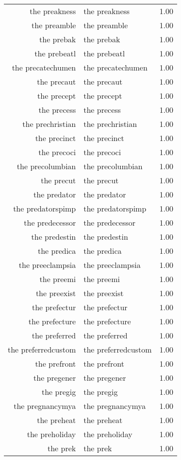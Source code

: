 \begin{table}[ht]
\begin{tabular}{rlr}
  the preakness & the preakness & 1.00 \\ 
  the preamble & the preamble & 1.00 \\ 
  the prebak & the prebak & 1.00 \\ 
  the prebeatl & the prebeatl & 1.00 \\ 
  the precatechumen & the precatechumen & 1.00 \\ 
  the precaut & the precaut & 1.00 \\ 
  the precept & the precept & 1.00 \\ 
  the precess & the precess & 1.00 \\ 
  the prechristian & the prechristian & 1.00 \\ 
  the precinct & the precinct & 1.00 \\ 
  the precoci & the precoci & 1.00 \\ 
  the precolumbian & the precolumbian & 1.00 \\ 
  the precut & the precut & 1.00 \\ 
  the predator & the predator & 1.00 \\ 
  the predatorspimp & the predatorspimp & 1.00 \\ 
  the predecessor & the predecessor & 1.00 \\ 
  the predestin & the predestin & 1.00 \\ 
  the predica & the predica & 1.00 \\ 
  the preeclampsia & the preeclampsia & 1.00 \\ 
  the preemi & the preemi & 1.00 \\ 
  the preexist & the preexist & 1.00 \\ 
  the prefectur & the prefectur & 1.00 \\ 
  the prefecture & the prefecture & 1.00 \\ 
  the preferred & the preferred & 1.00 \\ 
  the preferredcustom & the preferredcustom & 1.00 \\ 
  the prefront & the prefront & 1.00 \\ 
  the pregener & the pregener & 1.00 \\ 
  the pregig & the pregig & 1.00 \\ 
  the pregnancymya & the pregnancymya & 1.00 \\ 
  the preheat & the preheat & 1.00 \\ 
  the preholiday & the preholiday & 1.00 \\ 
  the prek & the prek & 1.00 \\ 

\end{tabular}
\end{table}

